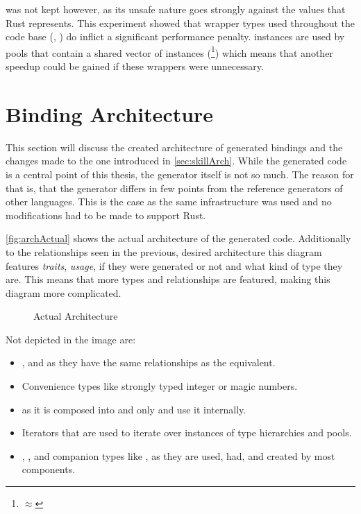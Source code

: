 \documentclass[thesis]{subfiles}
\begin{document}
      \HazardPtrT was not kept however, as its unsafe nature goes strongly against the values that Rust represents.
      This experiment showed that wrapper types used throughout the code base (\RcT, \RefCellT) do inflict a significant performance penalty.
      \PtrT instances are used by pools that contain a shared vector of \PtrT instances (\footnote{
         $\approx$ 
      }) which means that another speedup could be gained if these wrappers were unnecessary.

\section{Binding Architecture}
  This section will discuss the created architecture of generated bindings and the changes made to the one introduced in \autoref{sec:skillArch}.
  While the generated code is a central point of this thesis, the generator itself is not so much.
  The reason for that is, that the generator differs in few points from the reference generators of other languages.
  This is the case as the same infrastructure was used and no modifications had to be made to support Rust.

  \autoref{fig:archActual} shows the actual architecture of the generated code.
  Additionally to the relationships seen in the previous, desired architecture this diagram features \emph{traits}, \emph{usage}, if they were generated or not and what kind of type they are.
  This means that more types and relationships are featured, making this diagram more complicated.

  \begin{figure}[H]
    \centering
    
    \caption{Actual Architecture}\label{fig:archActual}
  \end{figure}

  Not depicted in the image are:
  \begin{itemize}
    \item \ForeignPool, \ForeignObject and \ForeignFieldDeclaration as they have the same relationships as the \UserType equivalent.
    \item Convenience types like strongly typed integer or magic numbers.
    \item \StringBlock as it is composed into \StringPool and only \FileReader and \FileWriter use it internally.
    \item Iterators that are used to iterate over instances of type hierarchies and pools.
    \item \SkillString, \SkillFail, \PtrT and \PtrT companion types like \WeakT, as they are used, had, and created by most components.
  \end{itemize}
\end{document}
